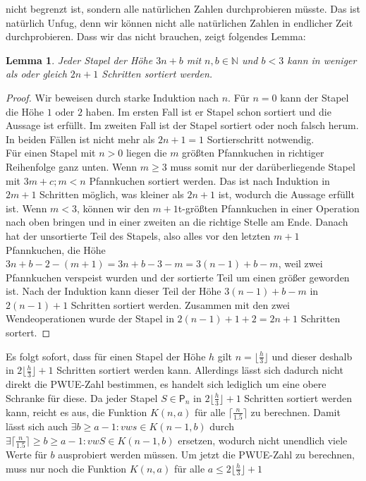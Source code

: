 \documentclass[a4paper,10pt,ngerman]{scrartcl}
\newtheorem{lemma}[theorem]{Lemma}
\begin{document}
nicht begrenzt ist, sondern alle natürlichen Zahlen durchprobieren müsste. Das ist natürlich Unfug, denn wir können nicht alle natürlichen
Zahlen in endlicher Zeit durchprobieren. Dass wir das nicht brauchen, zeigt folgendes Lemma:
\begin{lemma}
  Jeder Stapel der Höhe $3n+b$ mit $n,b\in \mathbb{N}$ und $b<3$ kann in weniger als oder gleich $2n+1$ Schritten sortiert werden.
\end{lemma}
\begin{proof}
  Wir beweisen durch starke Induktion nach $n$. Für $n=0$ kann der Stapel die Höhe $1$ oder $2$ haben. Im ersten Fall ist er Stapel schon sortiert
  und die Aussage ist erfüllt. Im zweiten Fall ist der Stapel sortiert oder noch falsch herum. In beiden Fällen ist nicht mehr als $2n+1=1$ Sortierschritt
  notwendig. \\
  Für einen Stapel mit $n>0$ liegen die $m$ größten Pfannkuchen in richtiger Reihenfolge ganz unten. Wenn $m\geq3$ muss somit nur der darüberliegende Stapel mit $3m+c;m<n$ Pfannkuchen
  sortiert werden. Das ist nach Induktion in $2m+1$ Schritten möglich, was kleiner als $2n+1$ ist, wodurch die Aussage erfüllt ist. Wenn $m<3$, können wir den $m+1$t-größten Pfannkuchen
  in einer Operation nach oben bringen und in einer zweiten an die richtige Stelle am Ende. Danach hat der unsortierte Teil des Stapels, also alles vor den letzten $m+1$ Pfannkuchen,
  die Höhe $3n+b-2-(m+1)=3n+b-3-m=3(n-1)+b-m$, weil zwei Pfannkuchen verspeist wurden und der sortierte Teil um einen größer geworden ist. Nach der Induktion kann dieser Teil der Höhe
  $3(n-1)+b-m$ in $2(n-1)+1$ Schritten sortiert werden. Zusammen mit den zwei Wendeoperationen wurde der Stapel in $2(n-1)+1+2=2n+1$ Schritten sortert.
\end{proof}
Es folgt sofort, dass für einen Stapel der Höhe $h$ gilt $n=\lfloor\frac{h}{3}\rfloor$ und dieser deshalb in $2\lfloor\frac{h}{3}\rfloor+1$ Schritten sortiert werden kann.
Allerdings lässt sich dadurch nicht direkt die PWUE-Zahl bestimmen, es handelt sich lediglich um eine obere Schranke für diese.
Da jeder Stapel $S \in \mathsf{P}_n$ in $2\lfloor\frac{h}{3}\rfloor+1$ Schritten sortiert werden kann, reicht es aus,
die Funktion $K(n,a)$ für alle $\lceil \frac{n}{1.5}\rceil$ zu berechnen.
Damit lässt sich auch $\exists b \geq a-1: vws \in K(n-1,b)$ durch $\exists \lceil \frac{n}{1.5}\rceil \geq b \geq a-1: vwS \in K(n-1,b)$
ersetzen, wodurch nicht unendlich viele Werte für $b$
ausprobiert werden müssen.
Um jetzt die PWUE-Zahl zu berechnen, muss nur noch die Funktion $K(n,a)$ für alle $a \leq 2\lfloor\frac{h}{3}\rfloor+1$
\end{document}
